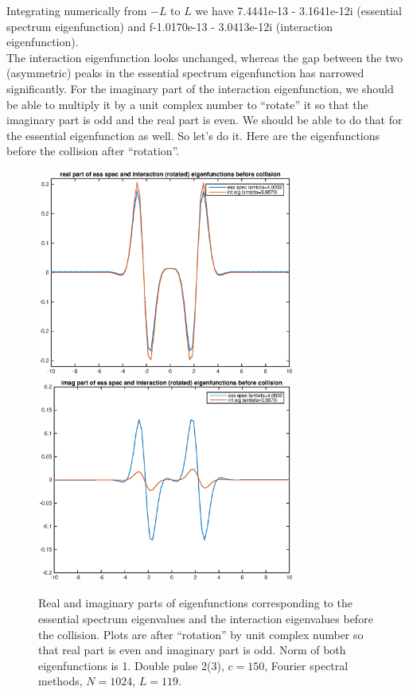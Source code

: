 \documentclass[12pt]{article}
\begin{document}
Integrating numerically from $-L$ to $L$ we have 7.4441e-13 - 3.1641e-12i (essential spectrum eigenfunction) and f-1.0170e-13 - 3.0413e-12i (interaction eigenfunction).\\

The interaction eigenfunction looks unchanged, whereas the gap between the two (asymmetric) peaks in the essential spectrum eigenfunction has narrowed significantly. For the imaginary part of the interaction eigenfunction, we should be able to multiply it by a unit complex number to ``rotate'' it so that the imaginary part is odd and the real part is even. We should be able to do that for the essential eigenfunction as well. So let's do it. Here are the eigenfunctions before the collision after ``rotation''.

\begin{figure}[H]
	\includegraphics[width=8.5cm]{eigbeforecollisionrealrotate1.eps}
	\includegraphics[width=8.5cm]{eigbeforecollisionimagrotate1.eps}
	\caption{Real and imaginary parts of eigenfunctions corresponding to the essential spectrum eigenvalues and the interaction eigenvalues before the collision. Plots are after ``rotation'' by unit complex number so that real part is even and imaginary part is odd. Norm of both eigenfunctions is 1. Double pulse 2(3), $c = 150$, Fourier spectral methods, $N = 1024$, $L = 119$. }
\end{figure}
\end{document}
